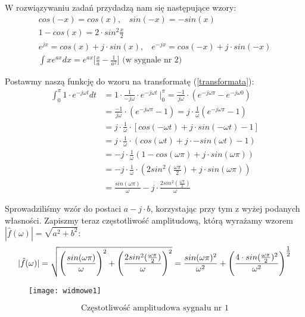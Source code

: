 \documentclass[11pt,a4paper]{article}
\numberwithin{liczba1}{liczba2}
\begin{document}
W rozwiązywaniu zadań przydadzą nam się następujące wzory:
\begin{gather*}
cos(-x) = cos(x), \ \ \ \ sin(-x) = -sin(x) \\
1 - cos(x) = 2 \cdot sin^2{\frac{x}{2}} \\
e^{jx} = cos(x) + j \cdot sin(x), \ \ \ \ e^{-jx} = cos(-x) + j \cdot sin(-x) \\
\int x e^{ax} dx = e^{ax}\Big[\frac{x}{a} - \frac{1}{a^2} \Big] \text{\ \ \ \ (w sygnale nr 2)}
\end{gather*}

Postawmy naszą funkcję do wzoru na transformatę (\ref{transformata}): \\
\begin{equation}
\begin{split}
\int_{0}^{\pi} 1 \cdot e^{-j \omega t} dt
&{} = 1 \cdot \frac{1}{-j \omega } \cdot e^{-j \omega t} \ \Bigg|^\pi_0 = \frac{-1}{j \omega} \cdot (e^{-j \omega \pi} - e^{-j \omega 0}) \\
&{} = \frac{-1}{j \omega} \cdot (e^{-j \omega \pi} - 1) = j \cdot \frac{1}{\omega}(e^{-j \omega \pi} - 1) \\
&{} = j \cdot \frac{1}{\omega} \cdot [cos(-\omega t) + j \cdot sin(-\omega t) - 1]\\
&{} = j \cdot \frac{1}{\omega} \cdot (cos(\omega t) + j \cdot -sin(\omega t) - 1)\\
&{} = -j \cdot \frac{1}{\omega}(1 - cos(\omega \pi) + j \cdot sin(\omega \pi)) \\
&{} = -j \cdot \frac{1}{\omega} \cdot (2sin^2(\frac{\omega \pi}{2}) + j \cdot sin(\omega \pi)) \\
&{} = \frac{sin(\omega \pi)}{\omega} - j \cdot \frac{2sin^2(\frac{\omega \pi}{2})}{\omega}
\end{split}
\end{equation}
\pagebreak

Sprowadziliśmy wzór do postaci $ a - j \cdot b $, korzystając przy tym z wyżej podanych własności. Zapiszmy teraz częstotliwość amplitudową, którą wyrażamy wzorem $ |\hat{f} (\omega)| = \sqrt{a^2 + b^2} $:
\begin{equation}
|\hat{f} (\omega)| = \sqrt{ \Bigg(\frac{sin(\omega \pi)}{\omega}\Bigg)^2 + \Bigg(\frac{2sin^2(\frac{\omega \pi}{2})}{\omega}\Bigg)^2 } = \frac{sin(\omega \pi)^2}{\omega^2} + \Bigg(\frac{4 \cdot sin(\frac{\omega \pi}{2})^2}{\omega^2}\Bigg)^\mathlarger{\frac{1}{2}}
\label{czestotliwosciowa}
\end{equation}
\begin{figure}[h]
\centering
\texttt{[image: widmowe1]}
\end{figure}
\[
\text{Częstotliwość amplitudowa sygnału nr 1}
\] \\
\end{document}
